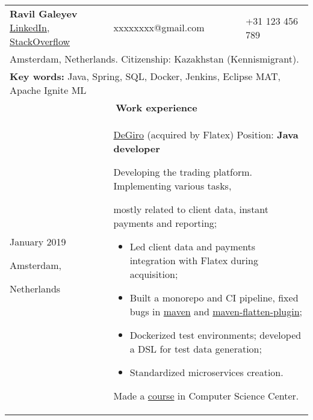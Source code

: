 \documentclass{article}
\begin{document}
\begin{longtable}{p{0.00in}p{0.00in}p{0.0in}p{0.00in}p{0.00in}}
\multicolumn{3}{p{\dimexpr3.00in+4\tabcolsep\relax}}{{\fontsize{16pt}{19.2pt}\selectfont
    \textbf{Ravil Galeyev}}
    \href{https://www.linkedin.com/in/ravil-galeyev-9a7540102}{LinkedIn},
    \href{http://stackoverflow.com/story/dehasi}{StackOverflow}
} &
\multicolumn{1}{l}{xxxxxxxx@gmail.com} &
\multicolumn{1}{l}{+31 123 456 789} \\

\multicolumn{5}{p{\dimexpr7.00in+8\tabcolsep\relax}}{
    Amsterdam, Netherlands. Citizenship: Kazakhstan (Kennismigrant).
\par} \\

\multicolumn{5}{p{\dimexpr7.00in+8\tabcolsep\relax}}{
    \textbf{Key words:} Java, Spring, SQL, Docker, Jenkins, Eclipse MAT, Apache Ignite ML
\par} \\

\multicolumn{5}{c}{\textbf{Work experience}} \\

\multicolumn{2}{p{\dimexpr1.00in+2\tabcolsep\relax}}{January 2019 \par Amsterdam,\par Netherlands} &
\multicolumn{3}{p{\dimexpr5.85in+4\tabcolsep\relax}}{\href{https://degiro.nl}{DeGiro} (acquired by Flatex)
Position: \textbf{Java developer} \par
Developing the trading platform. Implementing various tasks,
\par mostly related to client data, instant payments and reporting;
\begin{itemize}
    \item Led client data and payments integration with Flatex during acquisition;
    \item Built a monorepo and CI pipeline, fixed bugs in
          \href{https://github.com/apache/maven/pull/347}{maven}
           and  \href{https://github.com/mojohaus/flatten-maven-plugin/pull/152}{maven-flatten-plugin};
    \item Dockerized test environments; developed a DSL for test data generation;
    \item Standardized microservices creation.
    \end{itemize}
    Made a \href{https://compscicenter.ru/courses/practical-minimum/}{course} in Computer Science Center.
\par} \\


\end{longtable}
\end{document}
